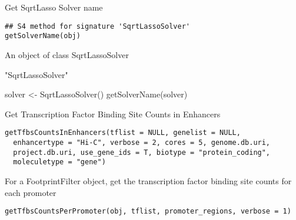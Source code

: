 \documentclass[a4paper]{book}
\begin{document}
%
\begin{Description}\relax
Get SqrtLasso Solver name
\end{Description}
%
\begin{Usage}
\begin{verbatim}
## S4 method for signature 'SqrtLassoSolver'
getSolverName(obj)
\end{verbatim}
\end{Usage}
%
\begin{Arguments}
\begin{ldescription}
\item[\code{obj}] An object of class SqrtLassoSolver
\end{ldescription}
\end{Arguments}
%
\begin{Value}
"SqrtLassoSolver"
\end{Value}
%
\begin{Examples}
\begin{ExampleCode}
solver <- SqrtLassoSolver()
getSolverName(solver)
\end{ExampleCode}
\end{Examples}
%
\begin{Description}\relax
Get Transcription Factor Binding Site Counts in Enhancers
\end{Description}
%
\begin{Usage}
\begin{verbatim}
getTfbsCountsInEnhancers(tflist = NULL, genelist = NULL,
  enhancertype = "Hi-C", verbose = 2, cores = 5, genome.db.uri,
  project.db.uri, use_gene_ids = T, biotype = "protein_coding",
  moleculetype = "gene")
\end{verbatim}
\end{Usage}
%
\begin{Description}\relax
For a FootprintFilter object, get the transcription factor binding site counts for each promoter
\end{Description}
%
\begin{Usage}
\begin{verbatim}
getTfbsCountsPerPromoter(obj, tflist, promoter_regions, verbose = 1)
\end{verbatim}
\end{Usage}
\end{document}

